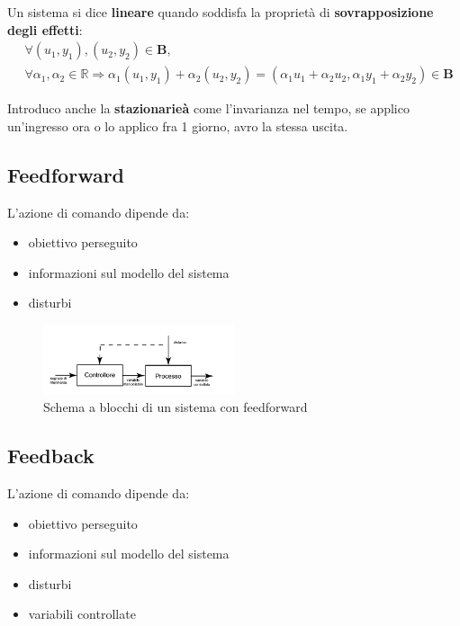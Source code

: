 Un sistema si dice \textbf{lineare} quando soddisfa la proprietà di \textbf{sovrapposizione degli effetti}:
\begin{align}
	 & \forall (u_1, y_1), (u_2, y_2) \in \mathbf{B},                                                                                                                            \\
	 & \forall \alpha_1, \alpha_2 \in \mathbb{R} \Rightarrow \alpha_1(u_1, y_1) + \alpha_2(u_2, y_2) = (\alpha_1 u_1 + \alpha_2 u_2, \alpha_1 y_1 + \alpha_2 y_2) \in \mathbf{B}
\end{align}

Introduco anche la \textbf{stazionarieà} come l'invarianza nel tempo, se applico un'ingresso ora o lo applico fra 1 giorno, avro la stessa uscita.

\subsection{Feedforward}
L'azione di comando dipende da:
\begin{itemize}
  \item obiettivo perseguito
  \item informazioni sul modello del sistema
  \item disturbi
\end{itemize}

\begin{figure}[!ht]
  \centering
  \includegraphics[width=0.5\textwidth]{./images/feedforward.png}
  \caption{Schema a blocchi di un sistema con feedforward}
  \label{fig:feedforward}
\end{figure}

\subsection{Feedback}

L'azione di comando dipende da:
\begin{itemize}
  \item obiettivo perseguito
  \item informazioni sul modello del sistema
  \item disturbi
  \item variabili controllate
\end{itemize}

